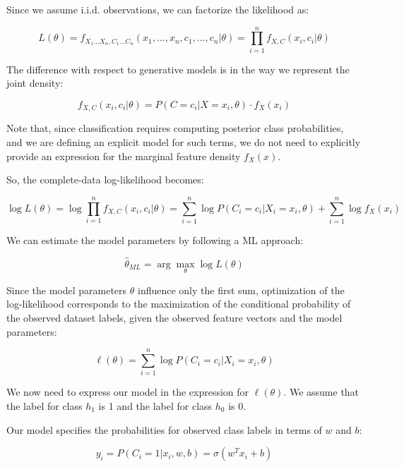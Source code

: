 Since we assume i.i.d. observations, we can factorize the likelihood as:


\begin{equation*}
L(\theta) = f_{X_1...X_n, C_1...C_n}(x_1, ..., x_n, c_1, ..., c_n | \theta) = \prod_{i=1}^n f_{X,C}(x_i, c_i | \theta)
\end{equation*}

The difference with respect to generative models is in the way we represent the joint density:


\begin{equation*}
f_{X,C}(x_i, c_i | \theta) = P(C = c_i | X = x_i, \theta) \cdot f_X(x_i)
\end{equation*}

Note that, since classification requires computing posterior class probabilities, and we are defining an explicit model for such terms, we do not need to explicitly provide an expression for the marginal feature density $f_X(x)$.

So, the complete-data log-likelihood becomes:


\begin{equation*}
\log L(\theta) = \log \prod_{i=1}^n f_{X,C}(x_i, c_i | \theta) = \sum_{i=1}^n \log P(C_i = c_i | X_i = x_i, \theta) + \sum_{i=1}^n \log f_X(x_i)
\end{equation*}

We can estimate the model parameters by following a ML approach:


\begin{equation*}
\hat{\theta}_{ML} = \arg\max_{\theta} \log L(\theta)
\end{equation*}

Since the model parameters $\theta$ influence only the first sum, optimization of the log-likelihood corresponds to the maximization of the conditional probability of the observed dataset labels, given the observed feature vectors and the model parameters:


\begin{equation*}
\ell(\theta) = \sum_{i=1}^n \log P(C_i = c_i | X_i = x_i, \theta)
\end{equation*}

We now need to express our model in the expression for $\ell(\theta)$. We assume that the label for class $h_1$ is 1 and the label for class $h_0$ is 0.

Our model specifies the probabilities for observed class labels in terms of $w$ and $b$:


\begin{equation*}
y_i = P(C_i = 1 | x_i, w, b) = \sigma(w^T x_i + b)
\end{equation*}

